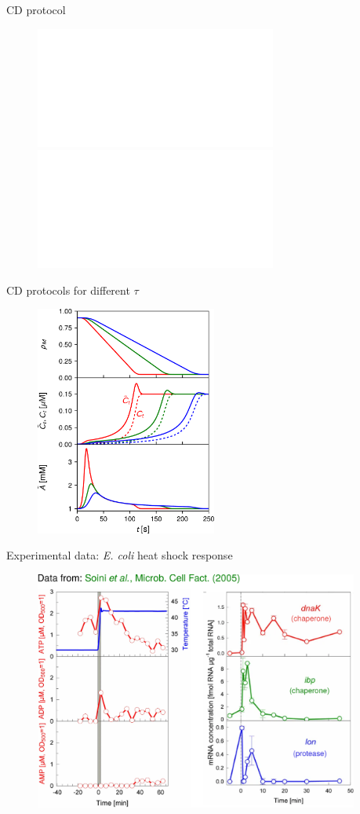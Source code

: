 \documentclass{beamer}
\begin{document}
\begin{frame}{CD protocol}
  \begin{figure}
\includegraphics<1>[width=\textwidth]{protocol_cd1.pdf}\includegraphics<2>[width=\textwidth]{protocol_cd2.pdf}
  \end{figure}
\end{frame}

\begin{frame}{CD protocols for different $\tau$}
  \begin{figure}
\includegraphics[width=0.53\textwidth]{cd_compare.pdf}
  \end{figure}
\end{frame}



\begin{frame}{Experimental data: {\it E. coli} heat shock response}

  \vspace{0.25em}
  \begin{figure}
    \centering
    \includegraphics[width=0.95\textwidth]{exper.pdf}
    \end{figure}
\end{frame}
\end{document}
